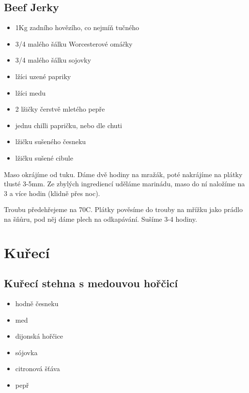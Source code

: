 \documentclass[10pt,a4paper]{article}
\newenvironment{myitemize}
{ \begin{itemize}
    \setlength{\itemsep}{0pt}
    \setlength{\parskip}{0pt}
    \setlength{\parsep}{0pt}     }
{ \end{itemize}                  }
\begin{document}
\subsection{Beef Jerky}
\begin{minipage}[t]{0,5\textwidth}
\begin{myitemize} 
\item 1Kg zadního hovězího, co nejmíň tučného
\item 3/4 malého šálku Worcesterové omáčky
\item 3/4 malého šálku sojovky
\item lžíci uzené papriky
\item lžíci medu
\item 2 lžičky čerstvě mletého pepře
\item jednu chilli papričku, nebo dle chuti
\item lžičku sušeného česneku
\item lžičku sušené cibule
\end{myitemize}
\end{minipage}
\begin{minipage}[t]{0,5\textwidth}
Maso okrájíme od tuku. Dáme dvě hodiny na mražák, poté nakrájíme na plátky tlusté 3-5mm. Ze zbylých ingrediencí uděláme marinádu, maso do ní naložíme na 3 a více hodin (klidně přes noc). 

Troubu předehřejeme na 70\degree C. Plátky pověsíme do trouby na mřížku jako prádlo na šňůru, pod něj dáme plech na odkapávání. Sušíme 3-4 hodiny.
\end{minipage}

\pagebreak
\section{Kuřecí}
\subsection{Kuřecí stehna s medouvou hořčicí}
\begin{minipage}[t]{0,5\textwidth}
\begin{myitemize} 
\item hodně česneku
\item med
\item dijonská hořčice
\item sójovka
\item citronová šťáva
\item pepř
\end{myitemize}
\end{minipage}
\begin{minipage}[t]{0,5\textwidth}

\end{minipage}
\end{document}
